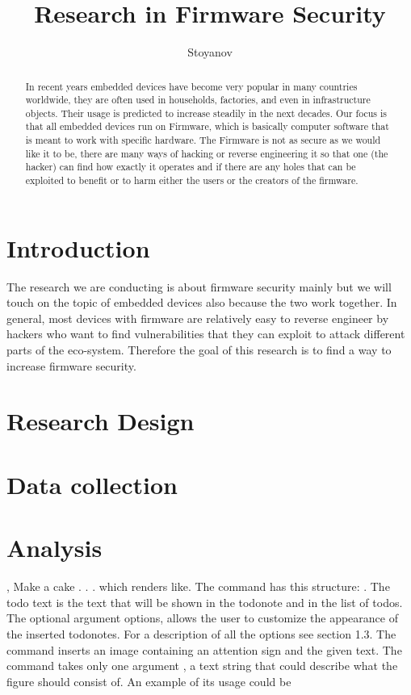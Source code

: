 \documentclass[]{report}
\title{Research in Firmware Security}
\author{Stoyanov}
\begin{document}
\maketitle

\begin{abstract}
	In recent years embedded devices have become very popular in many countries worldwide, they are often used in households, factories, and even in infrastructure objects. Their usage is predicted to increase steadily in the next decades. Our focus is that all embedded devices run on Firmware, which is basically computer software that is meant to work with specific hardware. The Firmware is not as secure as we would like it to be, there are many ways of hacking or reverse engineering it so that one (the hacker) can find how exactly it operates and if there are any holes that can be exploited to benefit or to harm either the users or the creators of the firmware.
\end{abstract}

\section{Introduction}
The research we are conducting is about firmware security mainly but we will touch on the topic of embedded devices also because the two work together. In general, most devices with firmware are relatively easy to reverse engineer by hackers who want to find vulnerabilities that they can exploit to attack different parts of the eco-system. Therefore the goal of this research is to find a way to increase firmware security.
\section{Research Design}

\section{Data collection}
\section{Analysis}



,
Make a cake . . . which renders like. The \todo command has this structure: . The todo text is the text that will be shown in the todonote and in the
list of todos. The optional argument options, allows the user to customize the
appearance of the inserted todonotes. For a description of all the options see
section 1.3.
\missingfigure The \missingfigure command inserts an image containing an attention sign
and the given text. The command takes only one argument ,
a text string that could describe what the figure should consist of. An example of
its usage could be
\end{document}
